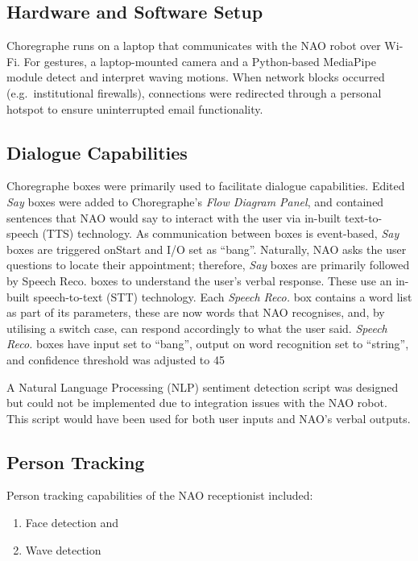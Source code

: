 \documentclass[conference]{IEEEtran}
\begin{document}
\subsection{Hardware and Software Setup} Choregraphe runs on a laptop that communicates with the NAO robot over Wi-Fi.
For gestures, a laptop-mounted camera and a Python-based MediaPipe module detect and interpret waving motions.
When network blocks occurred (e.g.\ institutional firewalls), connections were redirected through a personal hotspot to ensure uninterrupted email functionality.

\subsection{Dialogue Capabilities} Choregraphe boxes were primarily used to facilitate dialogue capabilities. Edited \textit{Say} boxes were added to Choregraphe’s \textit{Flow Diagram Panel}, and contained sentences that NAO would say to interact with the user via in-built text-to-speech (TTS) technology. As communication between boxes is event-based, \textit{Say} boxes are triggered onStart and I/O set as “bang”. Naturally, NAO asks the user questions to locate their appointment; therefore, \textit{Say} boxes are primarily followed by Speech Reco. boxes to understand the user’s verbal response. These use an in-built speech-to-text (STT) technology. Each \textit{Speech Reco.} box contains a word list as part of its parameters, these are now words that NAO recognises, and, by utilising a switch case, can respond accordingly to what the user said. \textit{Speech Reco.} boxes have input set to “bang”, output on word recognition set to “string”, and confidence threshold was adjusted to 45%

A Natural Language Processing (NLP) sentiment detection script was designed but could not be implemented due to integration issues with the NAO robot. This script would have been used for both user inputs and NAO’s verbal outputs. 

\subsection{Person Tracking}
Person tracking capabilities of the NAO receptionist included:
\begin{enumerate}
        \item Face detection and
        \item Wave detection
\end{enumerate}
\end{document}
